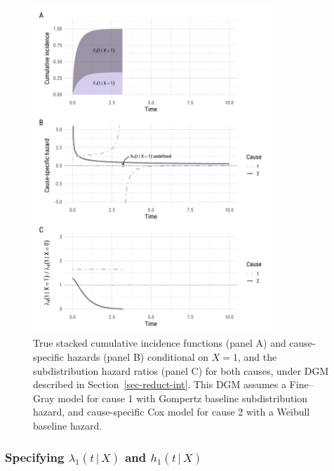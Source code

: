 \documentclass[
  letterpaper,
  DIV=11,
  numbers=noendperiod]{scrreprt}
\newcommand{\given}{\,|\,}
\begin{document}
\begin{figure}

{\centering \includegraphics[width=0.8\textwidth,height=\textheight]{chapters/../figures/fine-gray-DGM_reduc.pdf}

}

\caption{\label{fig-reduc}True stacked cumulative incidence functions
(panel A) and cause-specific hazards (panel B) conditional on \(X = 1\),
and the subdistribution hazard ratios (panel C) for both causes, under
DGM described in Section~\ref{sec-reduct-int}. This DGM assumes a
Fine--Gray model for cause 1 with Gompertz baseline subdistribution
hazard, and cause-specific Cox model for cause 2 with a Weibull baseline
hazard.}

\end{figure}

\hypertarget{specifying-lambda_1t-given-x-and-h_1t-given-x}{%
\subsubsection{\texorpdfstring{Specifying \(\lambda_1(t \given X)\) and
\(h_1(t \given X)\)}{Specifying \textbackslash lambda\_1(t \textbackslash given X) and h\_1(t \textbackslash given X)}}\label{specifying-lambda_1t-given-x-and-h_1t-given-x}}
\end{document}
